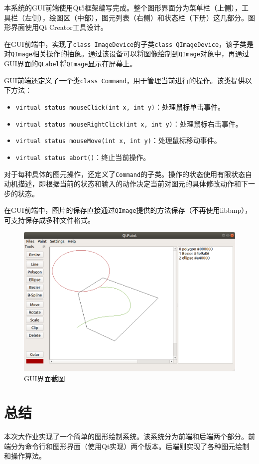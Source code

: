 \documentclass[a4paper,12pt]{article}
\begin{document}
本系统的GUI前端使用Qt5框架\cite{qtdoc}编写完成。整个图形界面分为菜单栏（上侧），工具栏（左侧），绘图区（中部），图元列表（右侧）和状态栏（下册）这几部分。图形界面使用Qt Creator工具设计。

在GUI前端中，实现了\lstinline|class ImageDevice|的子类\lstinline|class QImageDevice|，该子类是对\lstinline|QImage|相关操作的抽象。通过该设备可以将图像绘制到\lstinline|QImage|对象中，再通过GUI界面的\lstinline|QLabel|将\lstinline|QImage|显示在屏幕上。

GUI前端还定义了一个类\lstinline|class Command|，用于管理当前进行的操作。该类提供以下方法：
\begin{itemize}
	\item \lstinline|virtual status mouseClick(int x, int y)|：处理鼠标单击事件。
	\item \lstinline|virtual status mouseRightClick(int x, int y)|：处理鼠标右击事件。
	\item \lstinline|virtual status mouseMove(int x, int y)|：处理鼠标移动事件。
	\item \lstinline|virtual status abort()|：终止当前操作。
\end{itemize}

对于每种具体的图元操作，还定义了\lstinline|Command|的子类。操作的状态使用有限状态自动机描述，即根据当前的状态和输入的动作决定当前对图元的具体修改动作和下一步的状态。

在GUI前端中，图片的保存直接通过\lstinline|QImage|提供的方法保存（不再使用libbmp），可支持保存成多种文件格式。

\begin{figure}[htb]
\centering
\includegraphics[width=\linewidth]{screenshot.png}	
\caption{GUI界面截图}
\end{figure}

\section{总结}
本次大作业实现了一个简单的图形绘制系统。该系统分为前端和后端两个部分。前端分为命令行和图形界面（使用Qt实现）两个版本。后端则实现了各种图元绘制和操作算法。

%

\end{document}
